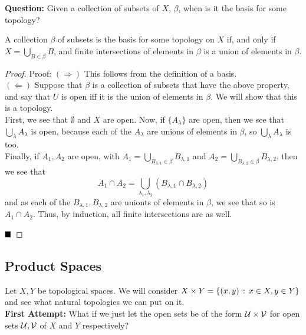 
\textbf{Question:} Given a collection of subsets of $X$, $\beta$, when is it the basis for some topology?

\begin{lemma}
    A collection $\beta$ of subsets is the basis for some topology on $X$ if, and only if $X = \bigcup_{B \in \beta} B$, and finite intersections of elements in $\beta$ is a union of elements in $\beta$. 
\end{lemma}
\begin{proof}{Proof:}
    $(\Rightarrow)$ This follows from the definition of a basis.\\

    $(\Leftarrow)$ Suppose that $\beta$ is a collection of subsets that have the above property, and say that $U$ is open iff it is the union of elements in $\beta$. We will show that this is a topology.\\

    First, we see that $\emptyset$ and $X$ are open. Now, if $\{A_{\lambda}\}$ are open, then we see that $\bigcup_{\lambda} A_{\lambda}$ is open, because each of the $A_{\lambda}$ are unions of elements in $\beta$, so $\bigcup_{\lambda} A_{\lambda}$ is too.\\

    Finally, if $A_1, A_2$ are open, with $A_1 = \bigcup_{B_{\lambda, 1} \in \beta} B_{\lambda, 1}$ and $A_2 = \bigcup_{B_{\lambda, 2} \in \beta} B_{\lambda, 2}$, then we see that
    \[ A_1 \cap A_2 = \bigcup_{\lambda_1, \lambda_2} (B_{\lambda, 1} \cap B_{\lambda, 2}) \]
    and as each of the $B_{\lambda, 1}, B_{\lambda, 2}$ are unionts of elements in $\beta$, we see that so is $A_1 \cap A_2$. Thus, by induction, all finite intersections are as well.

    $\qed$
\end{proof}

\subsection*{Product Spaces}

Let $X, Y$ be topological spaces. We will consider $X \times Y = \{(x, y) \col x \in X, y \in Y\}$ and see what natural topologies we can put on it.\\

\textbf{First Attempt:} What if we just let the open sets be of the form $\cal{U} \times \cal{V}$ for open sets $\cal{U}, \cal{V}$ of $X$ and $Y$ respectively?

